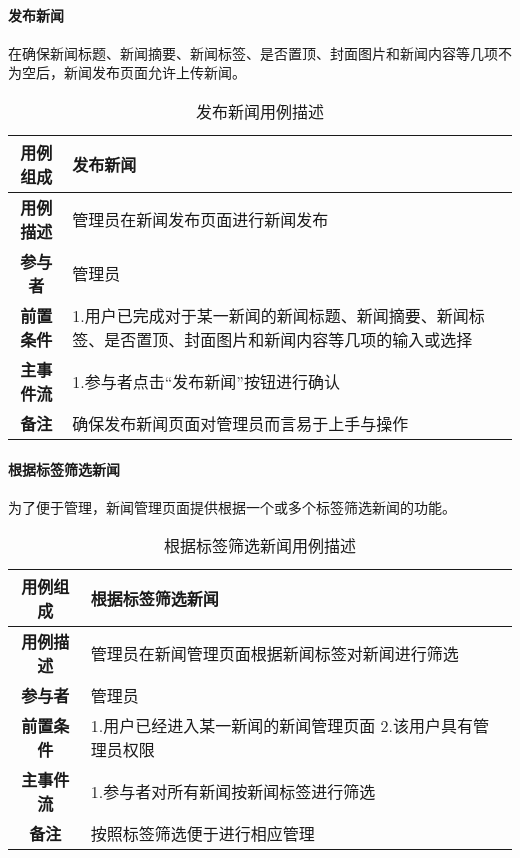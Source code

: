\paragraph{发布新闻}

在确保新闻标题、新闻摘要、新闻标签、是否置顶、封面图片和新闻内容等几项不为空后，新闻发布页面允许上传新闻。\\

\begin{table}[H]
	\centering
	\caption{发布新闻用例描述}
	\renewcommand\arraystretch{1.5}
	\begin{tabular}{|c|>{\raggedright\arraybackslash}p{10cm}|}
		\hline
		\textbf{用例组成} & \textbf{发布新闻}\\
		\hline
		\textbf{用例描述} & 管理员在新闻发布页面进行新闻发布\\ 
		\hline
		\textbf{参与者} & 管理员\\
		\hline
		\textbf{前置条件} & 
		1.用户已完成对于某一新闻的新闻标题、新闻摘要、新闻标签、是否置顶、封面图片和新闻内容等几项的输入或选择\\
		\hline
		\textbf{主事件流} & 
		1.参与者点击“发布新闻”按钮进行确认\\
		\hline
		\textbf{备注} & 确保发布新闻页面对管理员而言易于上手与操作\\
		\hline
	\end{tabular}
\end{table}

\paragraph{根据标签筛选新闻}

为了便于管理，新闻管理页面提供根据一个或多个标签筛选新闻的功能。\\

\begin{table}[H]
	\centering
	\caption{根据标签筛选新闻用例描述}
	\renewcommand\arraystretch{1.5}
	\begin{tabular}{|c|>{\raggedright\arraybackslash}p{10cm}|}
		\hline
		\textbf{用例组成} & \textbf{根据标签筛选新闻}\\
		\hline
		\textbf{用例描述} & 管理员在新闻管理页面根据新闻标签对新闻进行筛选\\ 
		\hline
		\textbf{参与者} & 管理员\\
		\hline
		\textbf{前置条件} & 
		1.用户已经进入某一新闻的新闻管理页面\newline
		2.该用户具有管理员权限\\
		\hline
		\textbf{主事件流} & 
		1.参与者对所有新闻按新闻标签进行筛选\\
		\hline
		\textbf{备注} & 按照标签筛选便于进行相应管理\\
		\hline
	\end{tabular}
\end{table}

